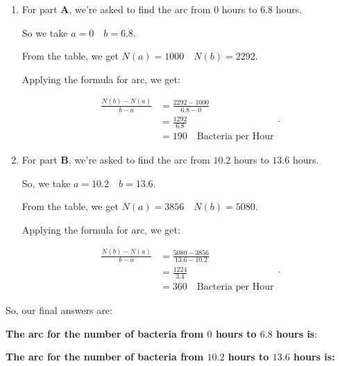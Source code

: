 \begin{enumerate}
  \label{enum:average_rate_of_bacteria_steps}

  \item For part \textbf{A}, we're asked to find the \gls{arc} from $0$ hours to
    $6.8$ hours.

    So we take $a = 0 \quad b = 6.8$.

    From the table, we get $N(a) = 1000 \quad N(b) = 2292$.

    Applying the formula for \gls{arc}, we get:

    \begin{equation}
      \label{eqt:average_rate_of_change_bacteria}
      \begin{split}
        \frac{N(b) - N(a)}{b - a} &= \frac{2292 - 1000}{6.8 - 0} \\
                                  &= \frac{1292}{6.8} \\
                                  &= \boxed{190 \quad \textrm{Bacteria per Hour}}
      \end{split}
    .\end{equation}

  \item For part \textbf{B}, we're asked to find the \gls{arc} from $10.2$ hours
    to $13.6$ hours.

    So, we take $a = 10.2 \quad b = 13.6$.

    From the table, we get $N(a) = 3856 \quad N(b) = 5080$.

    Applying the formula for \gls{arc}, we get:

    \begin{equation}
      \label{eqt:average_rate_of_change_bacteria_2}
      \begin{split}
        \frac{N(b) - N(a)}{b - a} &= \frac{5080 - 3856}{13.6 - 10.2} \\
                                  &= \frac{1224}{3.4} \\
                                  &= \boxed{360 \quad \textrm{Bacteria per Hour}}
      \end{split}
    .\end{equation}
\end{enumerate}

So, our final answers are:

\textbf{The \gls{arc} for the number of bacteria from $0$ hours to $6.8$ hours
is}: \\

\textbf{The \gls{arc} for the number of bacteria from $10.2$ hours to $13.6$ hours
is:} \\

\newpage
